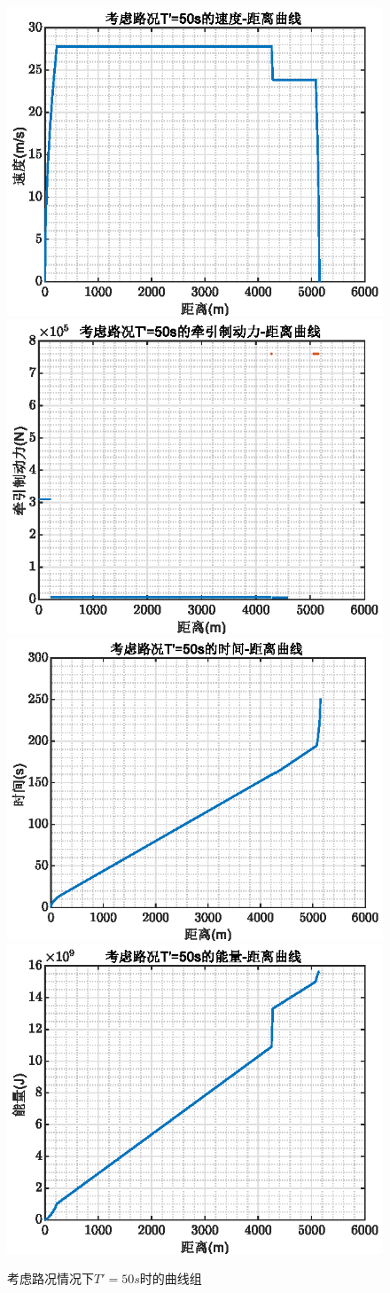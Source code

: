 \documentclass[12pt,a4paper]{nmmcm}
\begin{document}
\begin{figure}[H]
\centering
\includegraphics[width=.49\textwidth,height=0.3\textwidth]{figures/50aa.eps}
\includegraphics[width=.49\textwidth,height=0.3\textwidth]{figures/50bb.eps}
\includegraphics[width=.49\textwidth,height=0.3\textwidth]{figures/50cc.eps}
\includegraphics[width=.49\textwidth,height=0.3\textwidth]{figures/50dd.eps}
\caption{\song\wuhao 考虑路况情况下$T'=50s$时的曲线组}
\end{figure}
\end{document}

